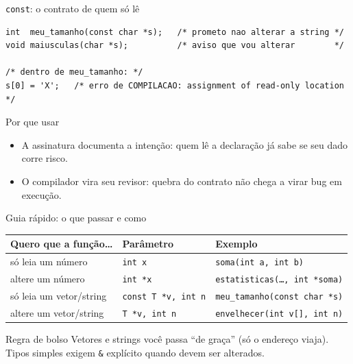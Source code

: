 \documentclass[aspectratio=169]{beamer}
\begin{document}
\begin{frame}[fragile]{\texttt{const}: o contrato de quem só lê}
\begin{lstlisting}[numbers=none]
int  meu_tamanho(const char *s);   /* prometo nao alterar a string */
void maiusculas(char *s);          /* aviso que vou alterar        */

/* dentro de meu_tamanho: */
s[0] = 'X';   /* erro de COMPILACAO: assignment of read-only location */
\end{lstlisting}
  \begin{block}{Por que usar}
    \begin{itemize}
      \item A assinatura documenta a intenção: quem lê a declaração já sabe se
            seu dado corre risco.
      \item O compilador vira seu revisor: quebra do contrato não chega a virar
            bug em execução.
    \end{itemize}
  \end{block}
\end{frame}

\begin{frame}{Guia rápido: o que passar e como}
  \begin{center}\small
  \begin{tabular}{@{}llp{5.2cm}@{}}
    \toprule
    \textbf{Quero que a função\ldots} & \textbf{Parâmetro} & \textbf{Exemplo} \\
    \midrule
    só leia um número            & \texttt{int x}          & \texttt{soma(int a, int b)} \\
    altere um número             & \texttt{int *x}         & \texttt{estatisticas(\ldots, int *soma)} \\
    só leia um vetor/string      & \texttt{const T *v, int n} & \texttt{meu\_tamanho(const char *s)} \\
    altere um vetor/string       & \texttt{T *v, int n}    & \texttt{envelhecer(int v[], int n)} \\
    \bottomrule
  \end{tabular}
  \end{center}
  \begin{block}{Regra de bolso}
    Vetores e strings você passa ``de graça'' (só o endereço viaja). Tipos
    simples exigem \texttt{\&} explícito quando devem ser alterados.
  \end{block}
\end{frame}
\end{document}
